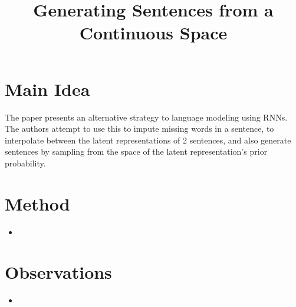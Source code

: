 \documentclass[12pt]{scrartcl}
\begin{document}
\title{Generating Sentences from a Continuous Space}
\author{}
\date{}
\maketitle

\section{Main Idea}
  The paper presents an alternative strategy to language modeling using RNNs. The authors attempt to use this to impute missing words in a sentence, to interpolate between the latent representations of 2 sentences, and also generate sentences by sampling from the space of the latent representation's prior probability. \cite{bowman2016generating}

\section{Method}
  \begin{itemize}
    \item 
  \end{itemize}

\section{Observations}
  \begin{itemize}
    \item 
  \end{itemize}



\end{document}
